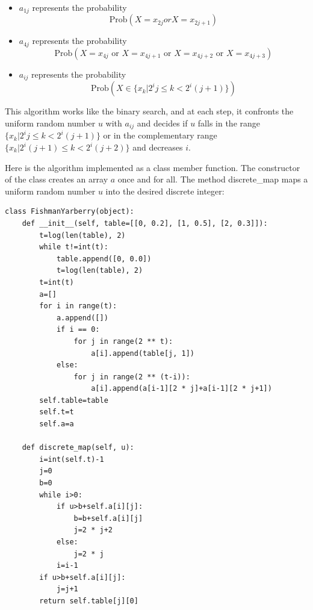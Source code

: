\documentclass[justified, sixbynine]{tufte-book}
\theoremstyle{plain}%
\newtheorem * {corollary}{Corollary}
\theoremstyle{definition}
\theoremstyle{remark}
\newtheorem * {remark}{Remark}
\newtheorem * {note}{Note}
\begin{document}
\begin{fullwidth}
\begin{itemize}
\item  $a_{1j}$ represents the probability
\begin{equation}
\textrm{Prob}(X=x_{2j}orX=x_{2j+1})
\end{equation}

\item  $a_{4j}$ represents the probability
\begin{equation}
\textrm{Prob}(X=x_{4j}\text{ or }X=x_{4j+1}\text{ or }X=x_{4j+2}\text{ or }X=x_{4j+3})
\end{equation}

\item  $a_{ij}$ represents the probability
\begin{equation}
\textrm{Prob}(X\in \{x_k|2^ij\leq k<2^i(j+1)\})
\end{equation}
\end{itemize}

This algorithm works like the binary search, and at each step, it confronts the
uniform random number $u$ with $a_{ij}$ and decides if $u$ falls in the
range $\{x_k|2^ij\leq k<2^i(j+1)\}$ or in the complementary range $%
\{x_k|2^i(j+1)\leq k<2^i(j+2)\}$ and decreases $i.$

Here is the algorithm implemented as a class member function. The
constructor of the class creates an array $a$ once and for all. The method
discrete\_map maps a uniform random number $u$ into the desired discrete
integer:


\begin{lstlisting}
class FishmanYarberry(object):
    def __init__(self, table=[[0, 0.2], [1, 0.5], [2, 0.3]]):
        t=log(len(table), 2)
        while t!=int(t):
            table.append([0, 0.0])
            t=log(len(table), 2)
        t=int(t)
        a=[]
        for i in range(t):
            a.append([])
            if i == 0:
                for j in range(2 ** t):
                    a[i].append(table[j, 1])
            else:
                for j in range(2 ** (t-i)):
                    a[i].append(a[i-1][2 * j]+a[i-1][2 * j+1])
        self.table=table
        self.t=t
        self.a=a

    def discrete_map(self, u):
        i=int(self.t)-1
        j=0
        b=0
        while i>0:
            if u>b+self.a[i][j]:
                b=b+self.a[i][j]
                j=2 * j+2
            else:
                j=2 * j
            i=i-1
        if u>b+self.a[i][j]:
            j=j+1
        return self.table[j][0]
\end{lstlisting}



\end{fullwidth}
\end{document}
